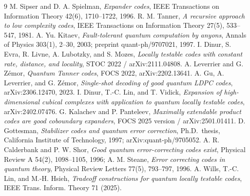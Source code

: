 \documentclass[10pt]{article}
\theoremstyle{compactdef}
\begin{document}
\begin{thebibliography}{9}\small
{} M. Sipser and D. A. Spielman, \emph{Expander codes}, IEEE Transactions on Information Theory 42(6), 1710--1722, 1996.
 R. M. Tanner, \emph{A recursive approach to low complexity codes}, IEEE Transactions on Information Theory 27(5), 533--547, 1981.
 A. Yu. Kitaev, \emph{Fault-tolerant quantum computation by anyons}, Annals of Physics 303(1), 2--30, 2003; preprint quant-ph/9707021, 1997.
 I. Dinur, S. Evra, R. Livne, A. Lubotzky, and S. Mozes, \emph{Locally testable codes with constant rate, distance, and locality}, STOC 2022 / arXiv:2111.04808.
 A. Leverrier and G. Z\'emor, \emph{Quantum Tanner codes}, FOCS 2022, arXiv:2202.13641.
 A. Gu, A. Leverrier, and G. Z\'emor, \emph{Single-shot decoding of good quantum LDPC codes}, arXiv:2306.12470, 2023.
 I. Dinur, T.-C. Lin, and T. Vidick, \emph{Expansion of high-dimensional cubical complexes with application to quantum locally testable codes}, arXiv:2402.07476.
 G. Kalachev and P. Panteleev, \emph{Maximally extendable product codes are good coboundary expanders}, FOCS 2025 version / arXiv:2501.01411.
 D. Gottesman, \emph{Stabilizer codes and quantum error correction}, Ph.D.\ thesis, California Institute of Technology, 1997; arXiv:quant-ph/9705052.
 A. R. Calderbank and P. W. Shor, \emph{Good quantum error-correcting codes exist}, Physical Review A 54(2), 1098--1105, 1996; A. M. Steane, \emph{Error correcting codes in quantum theory}, Physical Review Letters 77(5), 793--797, 1996.
 A. Wills, T.-C. Lin, and M.-H. Hsieh, \emph{Tradeoff constructions for quantum locally testable codes}, IEEE Trans. Inform. Theory 71 (2025).
\end{thebibliography}
\end{document}
